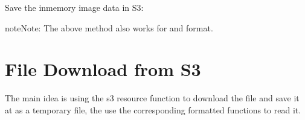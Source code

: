 \documentclass[letterpaper,12pt,english]{sphinxmanual}
\begin{document}
\sphinxAtStartPar
Save the in\sphinxhyphen{}memory image data in S3:

\begin{sphinxVerbatim}[commandchars=\\\{\}]
  
 
\end{sphinxVerbatim}

\begin{sphinxadmonition}{note}{Note:}
\sphinxAtStartPar
The above method also works for  and  format.
\end{sphinxadmonition}


\section{File Download from S3}
\label{\detokenize{s3:file-download-from-s3}}
\sphinxAtStartPar
The main idea is using the s3 resource function to download the file and save
it at  as a temporary file, the use the corresponding formatted
functions to read it.
\end{document}
